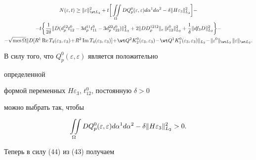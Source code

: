 \begin{multline} 


N(\varepsilon,t)\ge\|\varepsilon\|^2_{\wt L_2}+t\biggl[\, 


\intO DQ^0_p(\varepsilon,\varepsilon)d\alpha^1d\alpha^2- 


\delta\|H\varepsilon_3\|^2_{L_2}\biggr]- \\ 


%


-t\biggl\{\frac{1}{2\delta}\|D(d^{12}_p t^0_{12}- 


3d^{11}_p t^0_{11}-3d^{22}_p t^0_{22})\|^2_{L_2}+ 


2\|DD^{1212}_p\|_c\,\|t^0_{12}\|^2_{L_2}+ 


\frac{1}{\delta}\|df_3D\|^2_{L_2}\biggr\}-\\


%


-\sqrt{\mes \Omega}\|D[R^1\re T_4(\varepsilon_3,\varepsilon_3)\!+\!


R^2\im T_4(\varepsilon_3,\varepsilon_3)]\!+ \!


\wt Q^2K^0_2(\varepsilon_3,\varepsilon_3)\!- \!


\wt Q^1K^0_1(\varepsilon_3,\varepsilon_3)\|_{L_2}\!- \!


\|\varepsilon^0\|_{\wt L_2}\,\|\varepsilon\|_{\wt L_2}. 


\end{multline} 


В силу того, что $Q^0_p(\varepsilon,\varepsilon)$ является положительно 


определенной 


формой переменных $H\varepsilon_3$, $t^0_{12}$, постоянную $\delta>0$ 


можно выбрать так, чтобы 


\begin{equation} 


\intO DQ^0_p(\varepsilon,\varepsilon)d\alpha^1d\alpha^2- 


\delta\|H\varepsilon_3\|^2_{L_2}>0. 


\end{equation} 


Теперь в силу (44) из (43) получаем 


